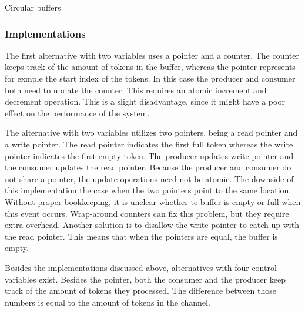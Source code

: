 \begin{homeworkProblem}
\begin{homeworkSection}{Circular buffers}
\subsubsection{Implementations}
	The first alternative with two variables uses a pointer and a counter. The counter keeps track of the amount of tokens in the buffer, whereas the pointer represents for exmple the start index of the tokens. 
	In this case the producer and consumer both need to update the counter. This requires an atomic increment and decrement operation. 
	This is a slight disadvantage, since it might have a poor effect on the performance of the system.
	
	The alternative with two variables utilizes two pointers, being a read pointer and a write pointer. 
	The read pointer indicates the first full token whereas the write pointer indicates the first empty token. 
	The producer updates write pointer and the consumer updates the read pointer. 
	Because the producer and consumer do not share a pointer, the update operations need not be atomic. The downside of this implementation 
	the case when the two pointers point to the same location. Without proper bookkeeping, it is unclear whether te buffer is empty or full when this event occurs. 
	Wrap-around counters can fix this problem, but they require extra overhead. Another solution is to disallow the write pointer to catch up with the read pointer. 
	This means that when the pointers are equal, the buffer is empty.

	Besides the implementations discussed above, alternatives with four control variables exist. 
	Besides the pointer, both the consumer and the producer keep track of the amount of tokens they processed. 
	The difference between those numbers is equal to the amount of tokens in the channel.
\end{homeworkSection}
\end{homeworkProblem}

